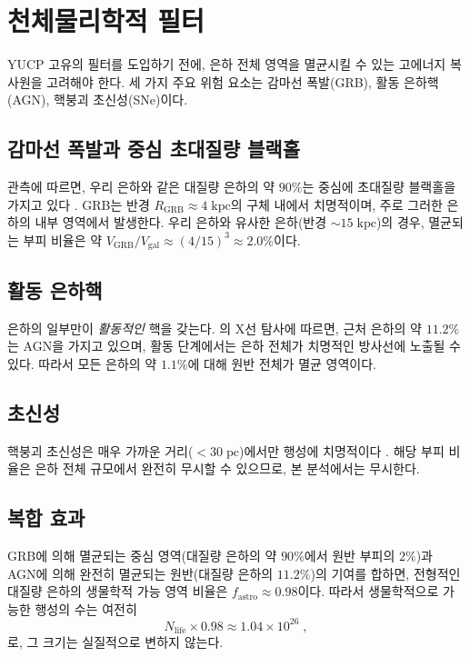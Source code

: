 \documentclass[11pt,a4paper]{article}
\begin{document}
	\section{천체물리학적 필터}
	\label{sec:astro_filters}
	YUCP 고유의 필터를 도입하기 전에, 은하 전체 영역을 멸균시킬 수 있는 고에너지 복사원을 고려해야 한다. 세 가지 주요 위험 요소는 감마선 폭발(GRB), 활동 은하핵(AGN), 핵붕괴 초신성(SNe)이다.
	
	\subsection{감마선 폭발과 중심 초대질량 블랙홀}
	\label{sec:grb}
	관측에 따르면, 우리 은하와 같은 대질량 은하의 약 \(90\%\)는 중심에 초대질량 블랙홀을 가지고 있다 \citep{Chandra2025}. GRB는 반경 \(R_{\mathrm{GRB}} \approx 4\;\mathrm{kpc}\)의 구체 내에서 치명적이며, 주로 그러한 은하의 내부 영역에서 발생한다. 우리 은하와 유사한 은하(반경 \(\sim 15\;\mathrm{kpc}\))의 경우, 멸균되는 부피 비율은 약 \(V_{\mathrm{GRB}}/V_{\mathrm{gal}} \approx (4/15)^{3} \approx 2.0\%\)이다.
	
	\subsection{활동 은하핵}
	\label{sec:agn}
	은하의 일부만이 \emph{활동적인} 핵을 갖는다. \citet{Foord2017}의 X선 탐사에 따르면, 근처 은하의 약 \(11.2\%\)는 AGN을 가지고 있으며, 활동 단계에서는 은하 전체가 치명적인 방사선에 노출될 수 있다. 따라서 모든 은하의 약 \(1.1\%\)에 대해 원반 전체가 멸균 영역이다.
	
	\subsection{초신성}
	\label{sec:sne}
	핵붕괴 초신성은 매우 가까운 거리(\(< 30\;\mathrm{pc}\))에서만 행성에 치명적이다 \citep{ThomasYelland2023}. 해당 부피 비율은 은하 전체 규모에서 완전히 무시할 수 있으므로, 본 분석에서는 무시한다.
	
	\subsection{복합 효과}
	\label{sec:total_astro}
	GRB에 의해 멸균되는 중심 영역(대질량 은하의 약 \(90\%\)에서 원반 부피의 \(2\%\))과 AGN에 의해 완전히 멸균되는 원반(대질량 은하의 \(11.2\%\))의 기여를 합하면, 전형적인 대질량 은하의 생물학적 가능 영역 비율은 \(f_{\mathrm{astro}} \approx 0.98\)이다. 따라서 생물학적으로 가능한 행성의 수는 여전히
	\begin{equation}
		N_{\mathrm{life}} \times 0.98 \approx 1.04\times 10^{26}\; ,
	\end{equation}
	로, 그 크기는 실질적으로 변하지 않는다.
	
\end{document}
